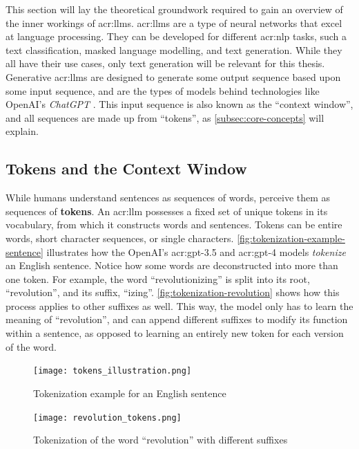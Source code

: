 This section will lay the theoretical groundwork required to gain an overview of the inner workings of \glspl{acr:llm}. \glspl{acr:llm} are a type of neural networks that excel at language processing. They can be developed for different \gls{acr:nlp} tasks, such a text classification, masked language modelling, and text generation. While they all have their use cases, only text generation will be relevant for this thesis. Generative \glspl{acr:llm} are designed to generate some output sequence based upon some input sequence, and are the types of models behind technologies like OpenAI's \textit{ChatGPT} \citep{openaiIntroducingChatGPT2022}. This input sequence is also known as the \enquote{context window}, and all sequences are made up from \enquote{tokens}, as \autoref{subsec:core-concepts} will explain.


\subsection{Tokens and the Context Window}
\label{subsec:core-concepts}

While humans understand sentences as sequences of words,  perceive them as sequences of \textbf{tokens}. An \acrshort{acr:llm} possesses a fixed set of unique tokens in its vocabulary, from which it constructs words and sentences. Tokens can be entire words, short character sequences, or single characters. \autoref{fig:tokenization-example-sentence} illustrates how the OpenAI's \acrshort{acr:gpt}-3.5 and \acrshort{acr:gpt}-4 models \textit{tokenize} an English sentence. Notice how some words are deconstructed into more than one token. For example, the word \enquote{revolutionizing} is split into its root, \enquote{revolution}, and its suffix, \enquote{izing}. \autoref{fig:tokenization-revolution} shows how this process applies to other suffixes as well. This way, the model only has to learn the meaning of \enquote{revolution}, and can append different suffixes to modify its function within a sentence, as opposed to learning an entirely new token for each version of the word.

\begin{figure}[htp]
    \centering
    \texttt{[image: tokens\_illustration.png]}
    \caption{Tokenization example for an English sentence}
    \label{fig:tokenization-example-sentence}
\end{figure}

\begin{figure}[htp]
    \centering
    \texttt{[image: revolution\_tokens.png]}
    \caption{Tokenization of the word \enquote{revolution} with different suffixes}
    \label{fig:tokenization-revolution}
\end{figure}

